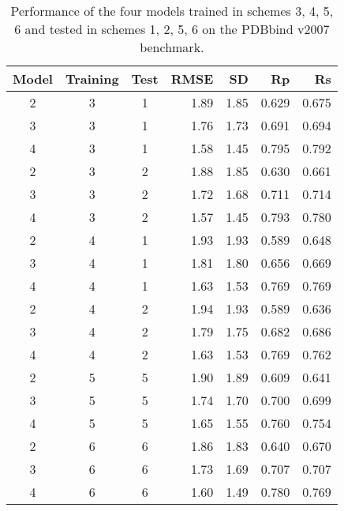 \documentclass[twocolumn]{bmcart}
\begin{document}
\begin{backmatter}
\begin{table}[ht]
\caption{Performance of the four models trained in schemes 3, 4, 5, 6 and tested in schemes 1, 2, 5, 6 on the PDBbind v2007 benchmark.}
\label{rescoring2:set-1-pdbbind-2007-trn-3456-tst-1256-raw}
\begin{tabular}{cccrrrr}
\hline
Model & Training & Test & RMSE & SD & Rp & Rs\\
\hline
2 & 3 & 1 & 1.89 & 1.85 & 0.629 & 0.675\\
3 & 3 & 1 & 1.76 & 1.73 & 0.691 & 0.694\\
4 & 3 & 1 & 1.58 & 1.45 & 0.795 & 0.792\\
\hline
2 & 3 & 2 & 1.88 & 1.85 & 0.630 & 0.661\\
3 & 3 & 2 & 1.72 & 1.68 & 0.711 & 0.714\\
4 & 3 & 2 & 1.57 & 1.45 & 0.793 & 0.780\\
\hline
2 & 4 & 1 & 1.93 & 1.93 & 0.589 & 0.648\\
3 & 4 & 1 & 1.81 & 1.80 & 0.656 & 0.669\\
4 & 4 & 1 & 1.63 & 1.53 & 0.769 & 0.769\\
\hline
2 & 4 & 2 & 1.94 & 1.93 & 0.589 & 0.636\\
3 & 4 & 2 & 1.79 & 1.75 & 0.682 & 0.686\\
4 & 4 & 2 & 1.63 & 1.53 & 0.769 & 0.762\\
\hline
2 & 5 & 5 & 1.90 & 1.89 & 0.609 & 0.641\\
3 & 5 & 5 & 1.74 & 1.70 & 0.700 & 0.699\\
4 & 5 & 5 & 1.65 & 1.55 & 0.760 & 0.754\\
\hline
2 & 6 & 6 & 1.86 & 1.83 & 0.640 & 0.670\\
3 & 6 & 6 & 1.73 & 1.69 & 0.707 & 0.707\\
4 & 6 & 6 & 1.60 & 1.49 & 0.780 & 0.769\\
\hline
\end{tabular}
\end{table}


\end{backmatter}
\end{document}
